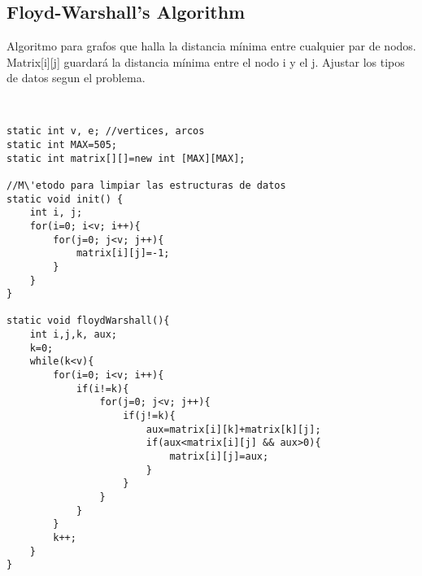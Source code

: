 \documentclass[11pt,letterpaper,twocolumn,twosided]{article}
\begin{document}
\subsection{Floyd-Warshall's Algorithm}
Algoritmo para grafos que halla la distancia m\'inima entre cualquier par de nodos. Matrix[i][j] guardar\'a la distancia m\'inima entre el nodo i y el j.
Ajustar los tipos de datos segun el problema.
\begin{lstlisting}


static int v, e; //vertices, arcos
static int MAX=505;     
static int matrix[][]=new int [MAX][MAX];

//M\'etodo para limpiar las estructuras de datos
static void init() {
    int i, j;
    for(i=0; i<v; i++){
        for(j=0; j<v; j++){
            matrix[i][j]=-1;
        }
    }
}

static void floydWarshall(){
    int i,j,k, aux;
    k=0;
    while(k<v){
        for(i=0; i<v; i++){
            if(i!=k){
                for(j=0; j<v; j++){
                    if(j!=k){
                        aux=matrix[i][k]+matrix[k][j];
                        if(aux<matrix[i][j] && aux>0){ 
                            matrix[i][j]=aux;
                        }
                    }
                }
            }
        }
        k++;
    }
}
\end{lstlisting}
\end{document}
